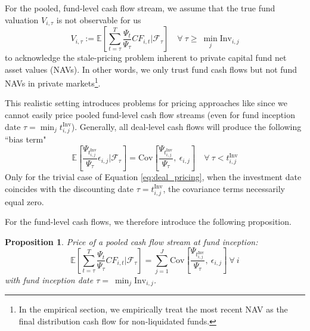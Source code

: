 \documentclass[12pt]{article}
\newtheorem{proposition}{Proposition}
\begin{document}
For the pooled, fund-level cash flow stream, we assume that the true fund valuation $V_{i,\tau}$ is not observable for us
\begin{equation}
	\label{eq:fund_valuation}
	V_{i,\tau} :=
	\mathbb{E} \left[ 
	\sum_{t = \tau}^T
	\frac{\Psi_{t}}{\Psi_{\tau}}
	{CF}_{i,t}
	\left| \mathcal{F}_{\tau} \right.
	\right]
	\quad \forall \ \tau \geq \ \min_j \mathrm{Inv}_{i,j}
\end{equation}
to acknowledge the stale-pricing problem inherent to private capital fund net asset values (NAVs).
In other words, we only trust fund cash flows but not fund NAVs in private markets\footnote{In the empirical section, we empirically treat the most recent NAV as the final distribution cash flow for non-liquidated funds.}.

This realistic setting introduces problems for pricing approaches like \cite{DLP12} since we cannot easily price pooled fund-level cash flow streams (even for fund inception date $\tau = \min_j t_{i,j}^{\mathrm{Inv}}$).
Generally, all deal-level cash flows will produce the following ``bias term"
\begin{equation}
	\label{eq:deal_level_bias}
	\mathbb{E} \left[ 
	\frac{\Psi_{t_{i,j}^{\mathrm{Inv}}}}{\Psi_{\tau}}
	\epsilon_{i,j}
	\left| \mathcal{F}_{\tau} \right.
	\right]
	=
	\mathrm{Cov} \left[ \frac{\Psi_{t_{i,j}^{\mathrm{Inv}}}}{\Psi_{\tau}}, \ \epsilon_{i,j} \right]
	\quad \forall \ \tau < t_{i,j}^{\mathrm{Inv}}
\end{equation}
Only for the trivial case of Equation \ref{eq:deal_pricing}, when the investment date coincides with the discounting date $\tau =  t_{i,j}^{\mathrm{Inv}}$, the covariance terms necessarily equal zero.

For the fund-level cash flows, we therefore introduce the following proposition.
\begin{proposition}
	\label{theo:pooled_bias}
	Price of a pooled cash flow stream at fund inception: \\
	\begin{equation}
		\label{eq:price_pooled_cash_flows}
		\mathbb{E} \left[ 
		\sum_{t = \tau}^T
		\frac{\Psi_{t}}{\Psi_{\tau}}
		{CF}_{i,t}
		\left| \mathcal{F}_{\tau} \right.
		\right]
		=
		\sum_{j=1}^J
		\mathrm{Cov} \left[ \frac{\Psi_{t_{i,j}^{\mathrm{Inv}}}}{\Psi_{\tau}}, \ \epsilon_{i,j} \right]
		\ \forall \ i
	\end{equation}
	with fund inception date $\tau = \ \min_j \mathrm{Inv}_{i,j}$.
\end{proposition}
\end{document}
